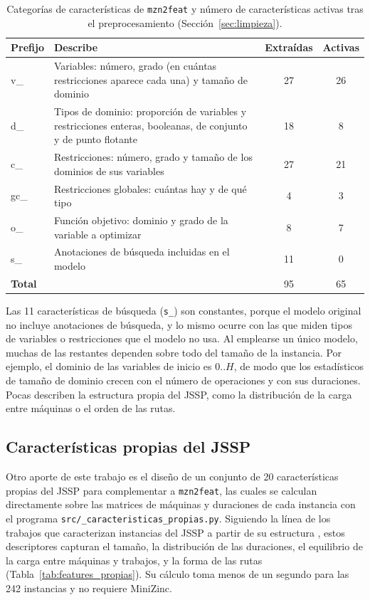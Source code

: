 \begin{table}[H]
  \centering
  \small
  \singlespacing
  \caption{Categorías de características de \texttt{mzn2feat} y número de
  características activas tras el preprocesamiento
  (Sección~\ref{sec:limpieza}).}
  \label{tab:categorias_features}
  \begin{tabularx}{\textwidth}{>{\ttfamily}l >{\raggedright\arraybackslash}X c c}
    \toprule
    \normalfont\textbf{Prefijo} & \textbf{Describe} & \textbf{Extraídas} & \textbf{Activas} \\
    \midrule
    v\_  & Variables: número, grado (en cuántas restricciones aparece cada una) y tamaño de dominio & 27 & 26 \\
    d\_  & Tipos de dominio: proporción de variables y restricciones enteras, booleanas, de conjunto y de punto flotante & 18 & 8 \\
    c\_  & Restricciones: número, grado y tamaño de los dominios de sus variables & 27 & 21 \\
    gc\_ & Restricciones globales: cuántas hay y de qué tipo & 4 & 3 \\
    o\_  & Función objetivo: dominio y grado de la variable a optimizar & 8 & 7 \\
    s\_  & Anotaciones de búsqueda incluidas en el modelo & 11 & 0 \\
    \midrule
    \normalfont\textbf{Total} & & 95 & 65 \\
    \bottomrule
  \end{tabularx}
\end{table}

Las 11 características de búsqueda (\texttt{s\_}) son constantes, porque el
modelo original no incluye anotaciones de búsqueda, y lo mismo ocurre con las
que miden tipos de variables o restricciones que el modelo no usa. Al
emplearse un único modelo, muchas de las restantes dependen sobre todo del
tamaño de la instancia. Por ejemplo, el dominio de las variables de inicio es
$0..H$, de modo que los estadísticos de tamaño de dominio crecen con el número
de operaciones y con sus duraciones. Pocas describen la estructura propia del
JSSP, como la distribución de la carga entre máquinas o el orden de las rutas.

\subsection{Características propias del JSSP}
\label{sec:features_propias}

Otro aporte de este trabajo es el diseño de un conjunto de 20 características
propias del JSSP para complementar a \texttt{mzn2feat}, las cuales se calculan
directamente sobre las matrices de máquinas y duraciones de cada instancia con
el programa \texttt{src/\_\allowbreak caracteristicas\_\allowbreak propias.py}.
Siguiendo la línea de los trabajos que caracterizan instancias del JSSP a
partir de su estructura \citep{mirshekarian2016}, estos descriptores capturan
el tamaño, la distribución de las duraciones, el equilibrio de la carga entre
máquinas y trabajos, y la forma de las rutas
(Tabla~\ref{tab:features_propias}). Su cálculo toma menos de un segundo para
las 242 instancias y no requiere MiniZinc.


